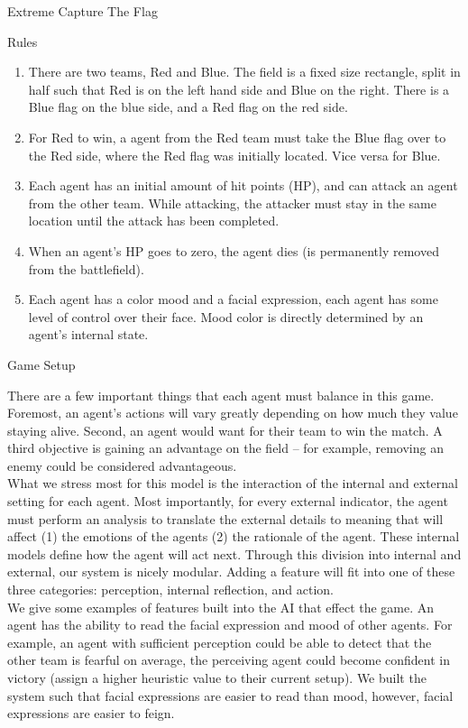 \documentclass[11pt]{article}
\begin{document}
\begin{section}{Extreme Capture The Flag}
\begin{subsection}{Rules}
\begin{enumerate}
\item There are two teams, Red and Blue. The field is a fixed size rectangle, split in half such that Red is on the left hand side and Blue on the right. There is a Blue flag on the blue side, and a Red flag on the red side.
\item For Red to win, a agent from the Red team must take the Blue flag over to the Red side, where the Red flag was initially located. Vice versa for Blue.
\item Each agent has an initial amount of hit points (HP), and can attack an agent from the other team. While attacking, the attacker must stay in the same location until the attack has been completed.
\item When an agent's HP goes to zero, the agent dies (is permanently removed from the battlefield).
\item Each agent has a color mood and a facial expression, each agent has some level of control over their face. Mood color is directly determined by an agent's internal state.
\end{enumerate}
\end{subsection}
\begin{subsection}{Game Setup}

There are a few important things that each agent must balance in this game. Foremost, an agent's actions will vary greatly depending on how much they value staying alive. Second, an agent would want for their team to win the match. A third objective is gaining an advantage on the field -- for example, removing an enemy could be considered advantageous.\\

What we stress most for this model is the interaction of the internal and external setting for each agent. Most importantly, for every external indicator, the agent must perform an analysis to translate the external details to meaning that will affect (1) the emotions of the agents (2) the rationale of the agent. These internal models define how the agent will act next. Through this division into internal and external, our system is nicely modular. Adding a feature will fit into one of these three categories: perception, internal reflection, and action. \\

We give some examples of features built into the AI that effect the game. An agent has the ability to read the facial expression and mood of other agents. For example, an agent with sufficient perception could be able to detect that the other team is fearful on average, the perceiving agent could become confident in victory (assign a higher heuristic value to their current setup). We built the system such that facial expressions are easier to read than mood, however, facial expressions are easier to feign.\\


\end{subsection}
\end{section}
\end{document}
